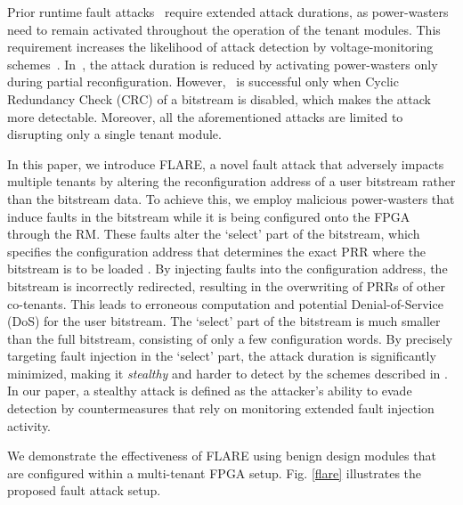 Prior runtime fault attacks~\cite{8056840, FPGAhammer, 7809042, 8844478} require extended attack durations, as power-wasters need to remain activated throughout the operation of the tenant modules. This requirement increases the likelihood of attack detection by voltage-monitoring schemes~\cite{9643485, 10.1145/3451236}. In~\cite{chaudhuri2024hackingfabrictargetingpartial}, the attack duration is reduced by activating power-wasters only during partial reconfiguration. However,~\cite{chaudhuri2024hackingfabrictargetingpartial} is successful only when Cyclic Redundancy Check (CRC) of a bitstream is disabled, which makes the attack more detectable. Moreover, all the aforementioned attacks are limited to disrupting only a single tenant module. 

In this paper, we introduce FLARE, a novel fault attack that adversely impacts multiple tenants by altering the reconfiguration address of a user bitstream rather than the bitstream data. To achieve this, we employ malicious power-wasters that induce faults in the bitstream while it is being configured onto the FPGA through the RM. These faults alter the `select' part of the bitstream, which specifies the configuration address that determines the exact PRR where the bitstream is to be loaded \cite{9643485}. By injecting faults into the configuration address, the bitstream is incorrectly redirected, resulting in the overwriting of PRRs of other co-tenants. This leads to erroneous computation and potential Denial-of-Service (DoS) for the user bitstream. The `select' part of the bitstream is much smaller than the full bitstream, consisting of only a few configuration words. By precisely targeting fault injection in the `select' part, the attack duration is significantly minimized, making it \textit{stealthy} and harder to detect by the schemes described in \cite{10.1145/3451236, 9643485}. In our paper, a stealthy attack is defined as the attacker's ability to evade detection by countermeasures that rely on monitoring extended fault injection activity. 


We demonstrate the effectiveness of FLARE using benign design modules that are configured within a multi-tenant FPGA setup. Fig. \ref{flare} illustrates the proposed fault attack setup.


